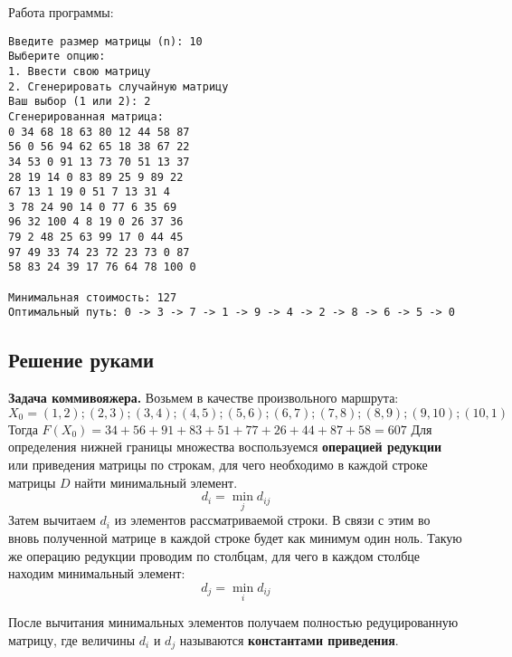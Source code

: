 \documentclass[17pt]{extarticle}
\begin{document}
Работа программы:
\begin{verbatim}
Введите размер матрицы (n): 10
Выберите опцию:
1. Ввести свою матрицу
2. Сгенерировать случайную матрицу
Ваш выбор (1 или 2): 2
Сгенерированная матрица:
0 34 68 18 63 80 12 44 58 87
56 0 56 94 62 65 18 38 67 22
34 53 0 91 13 73 70 51 13 37
28 19 14 0 83 89 25 9 89 22
67 13 1 19 0 51 7 13 31 4
3 78 24 90 14 0 77 6 35 69
96 32 100 4 8 19 0 26 37 36
79 2 48 25 63 99 17 0 44 45
97 49 33 74 23 72 23 73 0 87
58 83 24 39 17 76 64 78 100 0

Минимальная стоимость: 127
Оптимальный путь: 0 -> 3 -> 7 -> 1 -> 9 -> 4 -> 2 -> 8 -> 6 -> 5 -> 0
\end{verbatim}

\subsection*{Решение руками}
\textbf{Задача коммивояжера.}
Возьмем в качестве произвольного маршрута:
\[ X_0 = (1,2);(2,3);(3,4);(4,5);(5,6);(6,7);(7,8);(8,9);(9,10);(10,1) \]
Тогда \( F(X_0) = 34 + 56 + 91 + 83 + 51 + 77 + 26 + 44 + 87 + 58 = 607 \)
Для определения нижней границы множества воспользуемся \textbf{операцией редукции} или приведения матрицы по строкам, для чего необходимо в каждой строке матрицы \( D \) найти минимальный элемент.
\[ d_i = \min_j d_{ij} \]
Затем вычитаем \( d_i \) из элементов рассматриваемой строки. В связи с этим во вновь полученной матрице в каждой строке будет как минимум один ноль.
Такую же операцию редукции проводим по столбцам, для чего в каждом столбце находим минимальный элемент:
\[ d_j = \min_i d_{ij} \]

После вычитания минимальных элементов получаем полностью редуцированную матрицу, где величины \( d_i \) и \( d_j \) называются \textbf{константами приведения}.
\end{document}
